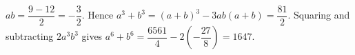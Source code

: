 $ab=\dfrac{9-12}{2}=-\dfrac{3}{2}$. Hence $a^3+b^3=(a+b)^3-3ab(a+b)=\dfrac{81}{2}$. Squaring and subtracting $2a^3b^3$ gives $a^6+b^6=\dfrac{6561}{4}-2(-\dfrac{27}{8})=\boxed{1647}$.
